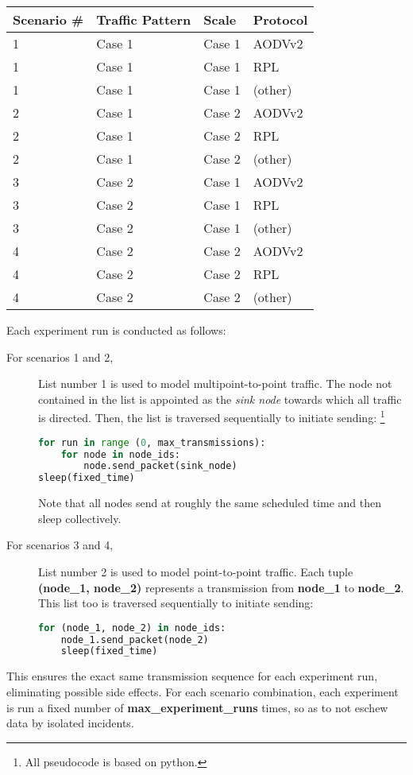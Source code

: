 \documentclass{acm_proc_article-sp}
\begin{document}
\begin{tabularx}{\linewidth}{l | X | l | X }
  Scenario \# & Traffic Pattern & Scale & Protocol \\
  \hline
  1 & Case 1 & Case 1 & AODVv2\\
  1 & Case 1 & Case 1 & RPL\\
  1 & Case 1 & Case 1 & (other)\\
  \hline
  2 & Case 1 & Case 2 & AODVv2\\
  2 & Case 1 & Case 2 & RPL\\
  2 & Case 1 & Case 2 & (other)\\
  \hline
  3 & Case 2 & Case 1 & AODVv2\\
  3 & Case 2 & Case 1 & RPL\\
  3 & Case 2 & Case 1 & (other)\\
  \hline
  4 & Case 2 & Case 2 & AODVv2\\
  4 & Case 2 & Case 2 & RPL\\
  4 & Case 2 & Case 2 & (other)\\
\end{tabularx}

Each experiment run is conducted as follows:

\begin{description}
\item[For scenarios 1 and 2,] List number 1 is used to model multipoint-to-point traffic. The node not contained in the list is appointed as the \emph{sink node} towards which all traffic is directed. Then, the list is traversed sequentially to initiate sending:
\footnote{All pseudocode is based on python.}
\begin{lstlisting}[language=python]
for run in range (0, max_transmissions):
    for node in node_ids:
        node.send_packet(sink_node)
sleep(fixed_time)
\end{lstlisting}
Note that all nodes send at roughly the same scheduled time and then sleep collectively.

\item[For scenarios 3 and 4,] List number 2 is used to model point-to-point traffic. Each tuple \textbf{(node\_1, node\_2)} represents a transmission from \textbf{node\_1} to \textbf{node\_2}. This list too is traversed sequentially to initiate sending:
\begin{lstlisting}[language=python]
for (node_1, node_2) in node_ids:
    node_1.send_packet(node_2)
    sleep(fixed_time)
\end{lstlisting}
\end{description}
This ensures the exact same transmission sequence for each experiment run, eliminating possible side effects.
For each scenario combination, each experiment is run a fixed number of \textbf{max\_experiment\_runs} times, so as to not eschew data by isolated incidents.
\end{document}
